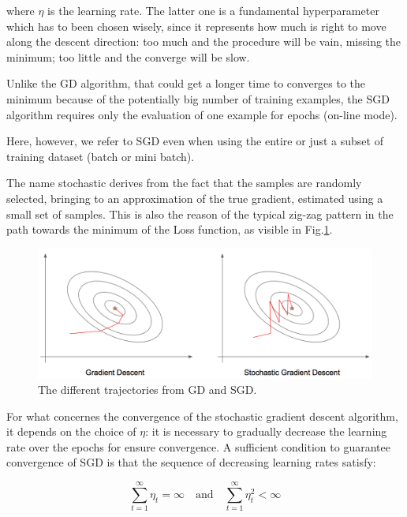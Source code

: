 		where $\eta$ is the learning rate. The latter one is a fundamental hyperparameter which has to been chosen wisely, since it represents how much is right to move along the descent direction: too much and the procedure will be vain, missing the minimum; too little and the converge will be slow.

		Unlike the GD algorithm, that could get a longer time to converges to the minimum because of the potentially big number of training examples, the SGD algorithm requires only the evaluation of one example for epochs (on-line mode).

		Here, however, we refer to SGD even when using the entire or just a subset of training dataset (batch or mini batch).

		The name stochastic derives from the fact that the samples are randomly selected, bringing to an approximation of the true gradient, estimated using a small set of samples. This is also the reason of the typical zig-zag pattern in the path towards the minimum of the Loss function, as visible in Fig.\ref{fig:gradient}.
		\begin{figure}
			\centering
		    \includegraphics[width=.8\linewidth, scale=0.7]{img/figures/gradient.png}
			\caption{The different trajectories from GD and SGD.}
			\label{fig:gradient}
		\end{figure}

		For what concernes the convergence of the stochastic gradient descent algorithm, it depends on the choice of $\eta$: it is necessary to gradually decrease the learning rate over the epochs for ensure convergence.
		A sufficient condition to guarantee convergence of SGD is that the sequence of decreasing learning rates satisfy:

		\begin{equation}
			\label{delta}
			\sum_{t=1}^\infty \eta_t = \infty \text{  } \text{ and }\text{  } \sum_{t=1}^\infty \eta_t^2 < \infty
		\end{equation}

